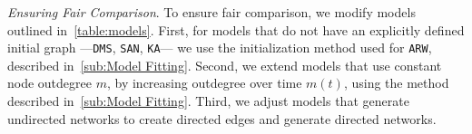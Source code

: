 %
%
%
%
%
%
%
%
%

\textit{Ensuring Fair Comparison}. To ensure fair comparison, we modify models outlined in~\cref{table:models}.
First, for models that do not have an explicitly defined initial graph ---\texttt{DMS}, \texttt{SAN}, \texttt{KA}--- we use the
initialization method used for \texttt{ARW}, described in~\cref{sub:Model Fitting}. Second, we extend
models that use constant node outdegree $m$, by increasing outdegree over time $m(t)$,
using the method described in~\cref{sub:Model Fitting}. Third, we adjust models that generate undirected networks to
create directed edges and generate directed networks.

